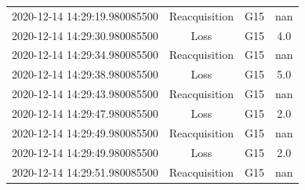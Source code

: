 \begin{enumerate}
\begin{longtabu}{cccc}
2020{-}12{-}14 14:29:19.980085500&Reacquisition&G15&nan\\%
2020{-}12{-}14 14:29:30.980085500&Loss&G15&4.0\\%
2020{-}12{-}14 14:29:34.980085500&Reacquisition&G15&nan\\%
2020{-}12{-}14 14:29:38.980085500&Loss&G15&5.0\\%
2020{-}12{-}14 14:29:43.980085500&Reacquisition&G15&nan\\%
2020{-}12{-}14 14:29:47.980085500&Loss&G15&2.0\\%
2020{-}12{-}14 14:29:49.980085500&Reacquisition&G15&nan\\%
2020{-}12{-}14 14:29:49.980085500&Loss&G15&2.0\\%
2020{-}12{-}14 14:29:51.980085500&Reacquisition&G15&nan\\%
\hline%
\end{longtabu}%
\end{enumerate}

